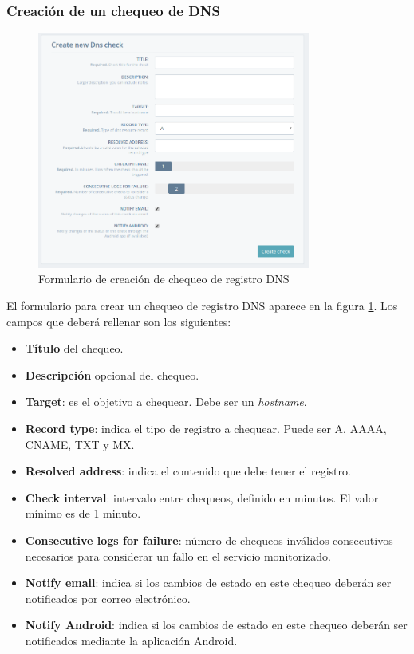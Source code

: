 \subsubsection{Creación de un chequeo de DNS}

\begin{figure}[hbtp]
  \centering
  \includegraphics[width=0.8\textwidth]{apendice_manual_usuario/pantalla_crear_dns.png}
  \caption{Formulario de creación de chequeo de registro DNS}
  \label{fig:crear-dns}
\end{figure}

El formulario para crear un chequeo de registro DNS aparece en la figura
\ref{fig:crear-dns}. Los campos que deberá rellenar son los siguientes:

\begin{itemize}
\item \textbf{Título} del chequeo.
\item \textbf{Descripción} opcional del chequeo.
\item \textbf{Target}: es el objetivo a chequear. Debe ser un \textit{hostname}.
\item \textbf{Record type}: indica el tipo de registro a chequear. Puede ser A, AAAA, CNAME, TXT y MX.
\item \textbf{Resolved address}: indica el contenido que debe tener el registro.
\item \textbf{Check interval}: intervalo entre chequeos, definido en minutos. El
  valor mínimo es de 1 minuto.
\item \textbf{Consecutive logs for failure}: número de chequeos inválidos
  consecutivos necesarios para considerar un fallo en el servicio monitorizado.
\item \textbf{Notify email}: indica si los cambios de estado en este chequeo
  deberán ser notificados por correo electrónico.
\item \textbf{Notify Android}: indica si los cambios de estado en este chequeo
  deberán ser notificados mediante la aplicación Android.
\end{itemize}

